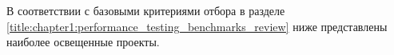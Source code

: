 В соответствии с базовыми критериями отбора в разделе \ref{title:chapter1:performance_testing_benchmarks_review} ниже представлены наиболее освещенные проекты.

\begin{description}[noitemsep]
	\item [Hayai \cite{hayai-repo}]
	\item [Celero \cite{celero-repo}]
	\item [Nonius \cite{nonius-repo}]
	\item [Google benchmark \cite{google-benchmark-repo}]
\end{description}